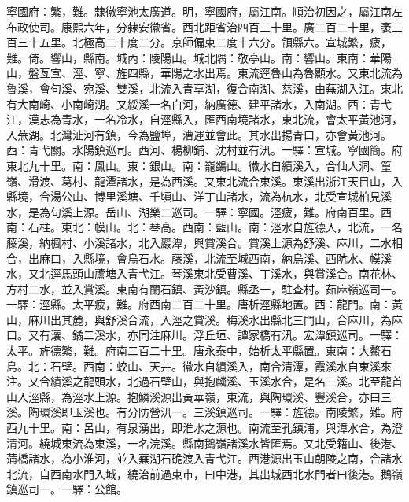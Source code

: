 \begin{pinyinscope}
寧國府：繁，難。隸徽寧池太廣道。明，寧國府，屬江南。順治初因之，屬江南左布政使司。康熙六年，分隸安徽省。西北距省治四百三十里。廣二百二十里，袤三百三十五里。北極高二十度二分。京師偏東二度十六分。領縣六。宣城繁，疲，難。倚。響山，縣南。城內：陵陽山。城北隅：敬亭山。南：響山。東南：華陽山，盤亙宣、涇、寧、旌四縣，華陽之水出焉。東流逕魯山為魯顯水。又東北流為魯溪，會句溪、宛溪、雙溪，北流入青草湖，復合南湖、慈溪，由蕪湖入江。東北有大南崎、小南崎湖。又綏溪一名白河，納廣德、建平諸水，入南湖。西：青弋江，漢志為青水，一名冷水，自涇縣入，匯西南境諸水，東北流，會太平黃池河，入蕪湖。北灣沚河有鎮，今為鹽埠，漕運並會此。其水出揚青口，亦會黃池河。西：青弋關。水陽鎮巡司。西河、楊柳鋪、沈村並有汛。一驛：宣城。寧國簡。府東北九十里。南：鳳山。東：銀山。南：巃鷁山。徽水自績溪入，合仙人洞、篁嶺、滑渡、葛村、龍潭諸水，是為西溪。又東北流合東溪。東溪出浙江天目山，入縣境，合湯公山、博里溪塘、千頃山、洋丁山諸水，流為杭水，北受宣城柏見溪水，是為句溪上源。岳山、湖樂二巡司。一驛：寧國。涇疲，難。府南百里。西南：石柱。東北：幙山。北：琴高。西南：藍山。南：涇水自旌德入，北流，一名藤溪，納楓村、小溪諸水，北入巖潭，與賞溪合。賞溪上源為舒溪、麻川，二水相合，出麻口，入縣境，會烏石水。藤溪，北流至城西南，納烏溪、西阬水、幙溪水，又北逕馬頭山蘆塘入青弋江。琴溪東北受曹溪、丁溪水，與賞溪合。南花林、方村二水，並入賞溪。東南有蘭石鎮、黃沙鎮。縣丞一，駐查村。茹麻嶺巡司一。一驛：涇縣。太平疲，難。府西南二百二十里。唐析涇縣地置。西：龍門。南：黃山，麻川出其麓，與舒溪合流，入涇之賞溪。梅溪水出縣北三門山，合麻川，為麻口。又有瀼、鐍二溪水，亦同注麻川。浮丘垣、譚家橋有汛。宏潭鎮巡司。一驛：太平。旌德繁，難。府南二百二十里。唐永泰中，始析太平縣置。東南：大鰲石島。北：石壁。西南：蛟山、天井。徽水自績溪入，南合清潭，霞溪水自東溪來注。又合績溪之龍頭水，北過石壁山，與抱麟溪、玉溪水合，是名三溪。北至龍首山入涇縣，為涇水上源。抱鱗溪源出黃華嶺，東流，與陶環溪、豐溪合，亦曰三溪。陶環溪即玉溪也。有分防營汛一。三溪鎮巡司。一驛：旌德。南陵繁，難。府西九十里。南：呂山，有泉湧出，即淮水之源也。南流至孔鎮浦，與漳水合，為澄清河。繞城東流為東溪，一名浣溪。縣南鵝嶺諸溪水皆匯焉。又北受籍山、後港、蒲橋諸水，為小淮河，並入蕪湖石硊渡入青弋江。西港源出玉山朗陵之南，合諸水北流，自西南水門入城，繞治前過東市，曰中港，其出城西北水門者曰後港。鵝嶺鎮巡司一。一驛：公館。


\end{pinyinscope}
